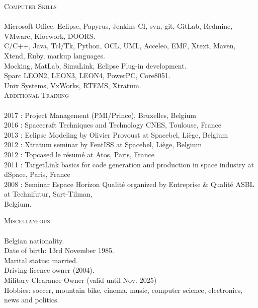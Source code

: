 \documentclass{article}
\newcommand{\lineunder}{\vspace*{-8pt} \\ \hspace*{-18pt} \hrulefill \\}
\newcommand{\header}[1]{{\hspace*{-15pt}\vspace*{6pt} \textsc{#1}} \vspace*{-6pt} \lineunder}
\begin{document}
\header{Computer Skills}
Microsoft Office, Eclipse, Papyrus, Jenkins CI, svn, git, GitLab, Redmine, VMware, Klocwork, DOORS. \\
C/C++, Java, Tcl/Tk, Python, OCL, UML, Acceleo, EMF, Xtext, Maven, Xtend, Ruby, markup languages. \\
Mocking, MatLab, SimuLink, Eclipse Plug-in development. \\
Sparc LEON2, LEON3, LEON4, PowerPC, Core8051. \\
Unix Systems, VxWorks, RTEMS, Xtratum. \\
\vspace{0.3cm} \header{Additional Training}
2017 : Project Management (PMI/Prince), Bruxelles, Belgium \\
2016 : Spacecraft Techniques and Technology CNES, Toulouse, France \\
2013 : Eclipse Modeling by Olivier Provoust at Spacebel, Liège, Belgium \\
2012 : Xtratum seminar by FentISS at Spacebel, Liège, Belgium \\
2012 : Topcased le résumé at Atos, Paris, France \\
2011 : TargetLink basics for code generation and production in space industry at dSpace, Paris, France \\
2008 : Seminar Espace Horizon Qualité organized by Entreprise \& Qualité ASBL at Technifutur, Sart-Tilman, \\
\hspace*{0.95cm} Belgium.

\vspace{0.3cm}
\header{Miscellaneous}
Belgian nationality. \\
Date of birth: 13rd November 1985. \\
Marital status: married. \\
Driving licence owner (2004). \\
Military Clearance Owner (valid until Nov. 2025) \\
Hobbies: soccer, mountain bike, cinema, music, computer science, electronics, news and politics.
\end{document}
